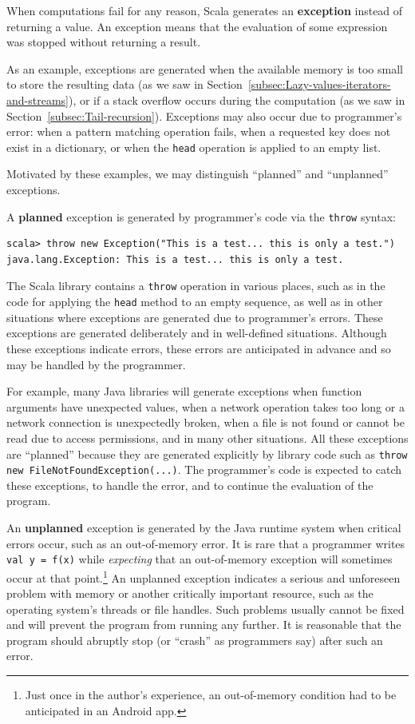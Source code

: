 When computations fail for any reason, Scala generates an \textbf{exception}
instead of returning a value. An exception means that the evaluation
of some expression was stopped without returning a result.

As an example, exceptions are generated when the available memory
is too small to store the resulting data (as we saw in Section~\ref{subsec:Lazy-values-iterators-and-streams}),
or if a stack overflow occurs during the computation (as we saw in
Section~\ref{subsec:Tail-recursion}). Exceptions may also occur
due to programmer\textsf{'}s error: when a pattern matching operation fails,
when a requested key does not exist in a dictionary, or when the \lstinline!head!
operation is applied to an empty list.

Motivated by these examples, we may distinguish \textsf{``}planned\textsf{''}
and \textsf{``}unplanned\textsf{''} exceptions. 

A \textbf{planned} exception is generated by programmer\textsf{'}s code via
the \lstinline!throw! syntax:
\begin{lstlisting}
scala> throw new Exception("This is a test... this is only a test.")
java.lang.Exception: This is a test... this is only a test.
\end{lstlisting}
The Scala library contains a \lstinline!throw! operation in various
places, such as in the code for applying the \lstinline!head! method
to an empty sequence, as well as in other situations where exceptions
are generated due to programmer\textsf{'}s errors. These exceptions are generated
deliberately and in well-defined situations. Although these exceptions
indicate errors, these errors are anticipated in advance and so may
be handled by the programmer.

For example, many Java libraries will generate exceptions when function
arguments have unexpected values, when a network operation takes too
long or a network connection is unexpectedly broken, when a file is
not found or cannot be read due to access permissions, and in many
other situations. All these exceptions are \textsf{``}planned\textsf{''} because they
are generated explicitly by library code such as \lstinline!throw new FileNotFoundException(...)!.
The programmer\textsf{'}s code is expected to catch these exceptions, to handle
the error, and to continue the evaluation of the program.

An \textbf{unplanned} exception is generated
by the Java runtime system when critical errors occur, such as an
out-of-memory error. It is rare that a programmer writes \lstinline!val y = f(x)!
while \emph{expecting} that an out-of-memory exception will sometimes
occur at that point.\footnote{Just once in the author\textsf{'}s experience, an out-of-memory condition had
to be anticipated in an Android app.} An unplanned exception indicates a serious and unforeseen problem
with memory or another critically important resource, such as the
operating system\textsf{'}s threads or file handles. Such problems usually
cannot be fixed and will prevent the program from running any further.
It is reasonable that the program should abruptly stop (or \textsf{``}crash\textsf{''}
as programmers say) after such an error.

